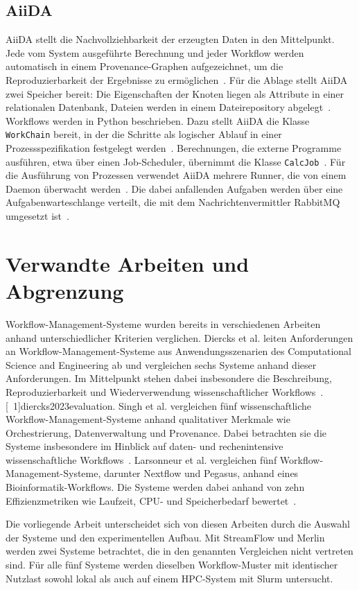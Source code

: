 \subsection{AiiDA}
\label{sec:basics:aiida}
AiiDA stellt die Nachvollziehbarkeit der erzeugten Daten in den
Mittelpunkt. Jede vom System ausgeführte Berechnung und jeder
Workflow werden automatisch in einem Provenance-Graphen
aufgezeichnet, um die Reproduzierbarkeit der Ergebnisse zu
ermöglichen~\cite[S.~2]{huber2020aiida}. Für die Ablage stellt
AiiDA zwei Speicher bereit: Die Eigenschaften der Knoten liegen
als Attribute in einer relationalen Datenbank, Dateien werden in
einem Dateirepository abgelegt~\cite[S.~8]{huber2020aiida}.
Workflows werden in Python beschrieben. Dazu stellt AiiDA die
Klasse \texttt{WorkChain} bereit, in der die Schritte als
logischer Ablauf in einer Prozessspezifikation festgelegt
werden~\cite[S.~4\,f.]{huber2020aiida}. Berechnungen, die externe
Programme ausführen, etwa über einen Job-Scheduler, übernimmt die
Klasse \texttt{CalcJob}~\cite[S.~4]{huber2020aiida}.
Für die Ausführung von Prozessen verwendet AiiDA mehrere Runner,
die von einem Daemon überwacht werden~\cite[S.~3]{huber2020aiida}. Die dabei
anfallenden Aufgaben werden über eine Aufgabenwarteschlange
verteilt, die mit dem Nachrichtenvermittler RabbitMQ umgesetzt
ist~\cite[S.~3]{huber2020aiida}.

\section{Verwandte Arbeiten und Abgrenzung}
\label{sec:basics:related}
Workflow-Management-Systeme wurden bereits in verschiedenen
Arbeiten anhand unterschiedlicher Kriterien verglichen.
Diercks et al. leiten Anforderungen an Workflow-Management-Systeme
aus Anwendungsszenarien des Computational Science and Engineering
ab und vergleichen sechs Systeme anhand dieser Anforderungen.
Im Mittelpunkt stehen dabei insbesondere die Beschreibung,
Reproduzierbarkeit und Wiederverwendung wissenschaftlicher
Workflows~\citeS.[~1]{diercks2023evaluation}.
Singh et al. vergleichen fünf wissenschaftliche
Workflow-Management-Systeme anhand qualitativer Merkmale wie
Orchestrierung, Datenverwaltung und Provenance.
Dabei betrachten sie die Systeme insbesondere im Hinblick auf
daten- und rechenintensive wissenschaftliche
Workflows~\cite[S.~4553]{singh2019evaluating}.
Larsonneur et al. vergleichen fünf Workflow-Management-Systeme,
darunter Nextflow und Pegasus, anhand eines
Bioinformatik-Workflows. Die Systeme werden dabei anhand von
zehn Effizienzmetriken wie Laufzeit, CPU- und Speicherbedarf
bewertet~\cite[S.~2773\,f.]{larsonneur2018evaluating}.

Die vorliegende Arbeit unterscheidet sich von diesen Arbeiten
durch die Auswahl der Systeme und den experimentellen Aufbau.
Mit StreamFlow und Merlin werden zwei Systeme betrachtet, die in
den genannten Vergleichen nicht vertreten sind. Für alle fünf
Systeme werden dieselben Workflow-Muster mit identischer Nutzlast
sowohl lokal als auch auf einem HPC-System mit Slurm untersucht.